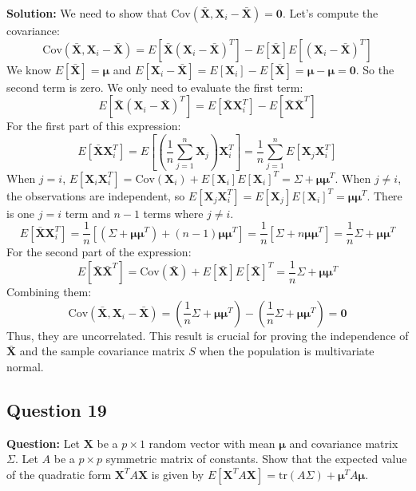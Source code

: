 \textbf{Solution:}
We need to show that $\text{Cov}(\bar{\mathbf{X}}, \mathbf{X}_i - \bar{\mathbf{X}}) = \mathbf{0}$.
Let's compute the covariance:
$$ \text{Cov}(\bar{\mathbf{X}}, \mathbf{X}_i - \bar{\mathbf{X}}) = E[\bar{\mathbf{X}}(\mathbf{X}_i - \bar{\mathbf{X}})^T] - E[\bar{\mathbf{X}}]E[(\mathbf{X}_i - \bar{\mathbf{X}})^T] $$
We know $E[\bar{\mathbf{X}}] = \boldsymbol{\mu}$ and $E[\mathbf{X}_i - \bar{\mathbf{X}}] = E[\mathbf{X}_i] - E[\bar{\mathbf{X}}] = \boldsymbol{\mu} - \boldsymbol{\mu} = \mathbf{0}$.
So the second term is zero. We only need to evaluate the first term:
$$ E[\bar{\mathbf{X}}(\mathbf{X}_i - \bar{\mathbf{X}})^T] = E[\bar{\mathbf{X}}\mathbf{X}_i^T] - E[\bar{\mathbf{X}}\bar{\mathbf{X}}^T] $$
For the first part of this expression:
$$ E[\bar{\mathbf{X}}\mathbf{X}_i^T] = E\left[ \left(\frac{1}{n}\sum_{j=1}^n \mathbf{X}_j\right) \mathbf{X}_i^T \right] = \frac{1}{n} \sum_{j=1}^n E[\mathbf{X}_j \mathbf{X}_i^T] $$
When $j=i$, $E[\mathbf{X}_i \mathbf{X}_i^T] = \text{Cov}(\mathbf{X}_i) + E[\mathbf{X}_i]E[\mathbf{X}_i]^T = \Sigma + \boldsymbol{\mu}\boldsymbol{\mu}^T$.
When $j \neq i$, the observations are independent, so $E[\mathbf{X}_j \mathbf{X}_i^T] = E[\mathbf{X}_j]E[\mathbf{X}_i]^T = \boldsymbol{\mu}\boldsymbol{\mu}^T$.
There is one $j=i$ term and $n-1$ terms where $j \neq i$.
$$ E[\bar{\mathbf{X}}\mathbf{X}_i^T] = \frac{1}{n} [(\Sigma + \boldsymbol{\mu}\boldsymbol{\mu}^T) + (n-1)\boldsymbol{\mu}\boldsymbol{\mu}^T] = \frac{1}{n}[\Sigma + n\boldsymbol{\mu}\boldsymbol{\mu}^T] = \frac{1}{n}\Sigma + \boldsymbol{\mu}\boldsymbol{\mu}^T $$
For the second part of the expression:
$$ E[\bar{\mathbf{X}}\bar{\mathbf{X}}^T] = \text{Cov}(\bar{\mathbf{X}}) + E[\bar{\mathbf{X}}]E[\bar{\mathbf{X}}]^T = \frac{1}{n}\Sigma + \boldsymbol{\mu}\boldsymbol{\mu}^T $$
Combining them:
$$ \text{Cov}(\bar{\mathbf{X}}, \mathbf{X}_i - \bar{\mathbf{X}}) = \left(\frac{1}{n}\Sigma + \boldsymbol{\mu}\boldsymbol{\mu}^T\right) - \left(\frac{1}{n}\Sigma + \boldsymbol{\mu}\boldsymbol{\mu}^T\right) = \mathbf{0} $$
Thus, they are uncorrelated. This result is crucial for proving the independence of $\bar{\mathbf{X}}$ and the sample covariance matrix $S$ when the population is multivariate normal.

\subsection*{Question 19}
\textbf{Question:} Let $\mathbf{X}$ be a $p \times 1$ random vector with mean $\boldsymbol{\mu}$ and covariance matrix $\Sigma$. Let $A$ be a $p \times p$ symmetric matrix of constants. Show that the expected value of the quadratic form $\mathbf{X}^T A \mathbf{X}$ is given by $E[\mathbf{X}^T A \mathbf{X}] = \text{tr}(A\Sigma) + \boldsymbol{\mu}^T A \boldsymbol{\mu}$.

